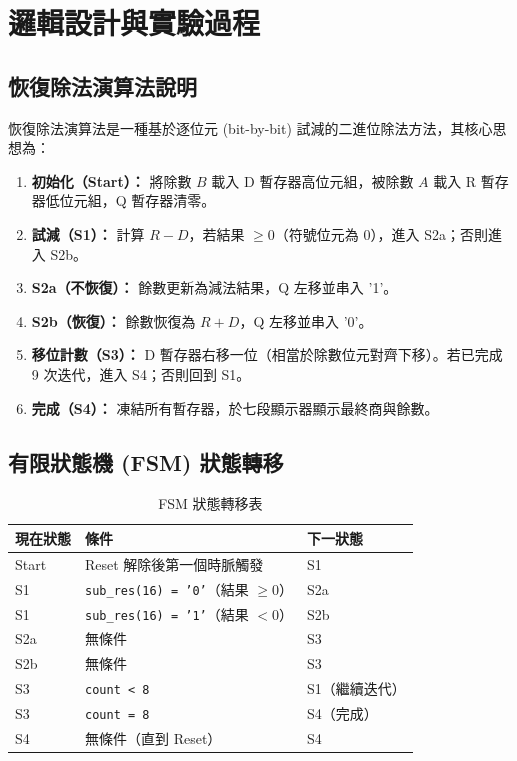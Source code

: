\documentclass[12pt, a4paper]{article}
\begin{document}
\section{邏輯設計與實驗過程}

\subsection{恢復除法演算法說明}

恢復除法演算法是一種基於逐位元 (bit-by-bit) 試減的二進位除法方法，其核心思想為：

\begin{enumerate}
    \item \textbf{初始化（Start）：} 將除數 $B$ 載入 D 暫存器高位元組，被除數 $A$ 載入 R 暫存器低位元組，Q 暫存器清零。
    \item \textbf{試減（S1）：} 計算 $R - D$，若結果 $\geq 0$（符號位元為 0），進入 S2a；否則進入 S2b。
    \item \textbf{S2a（不恢復）：} 餘數更新為減法結果，Q 左移並串入 '1'。
    \item \textbf{S2b（恢復）：} 餘數恢復為 $R + D$，Q 左移並串入 '0'。
    \item \textbf{移位計數（S3）：} D 暫存器右移一位（相當於除數位元對齊下移）。若已完成 9 次迭代，進入 S4；否則回到 S1。
    \item \textbf{完成（S4）：} 凍結所有暫存器，於七段顯示器顯示最終商與餘數。
\end{enumerate}

\subsection{有限狀態機 (FSM) 狀態轉移}

\begin{table}[H]
    \centering
    \caption{FSM 狀態轉移表}
    \begin{tabular}{@{}lll@{}}
        \toprule
        \textbf{現在狀態} & \textbf{條件} & \textbf{下一狀態} \\ \midrule
        Start  & Reset 解除後第一個時脈觸發 & S1 \\
        S1     & \texttt{sub\_res(16) = '0'}（結果 $\geq 0$） & S2a \\
        S1     & \texttt{sub\_res(16) = '1'}（結果 $< 0$）    & S2b \\
        S2a    & 無條件 & S3 \\
        S2b    & 無條件 & S3 \\
        S3     & \texttt{count < 8} & S1（繼續迭代）\\
        S3     & \texttt{count = 8} & S4（完成）\\
        S4     & 無條件（直到 Reset） & S4 \\
        \bottomrule
    \end{tabular}
\end{table}
\end{document}
